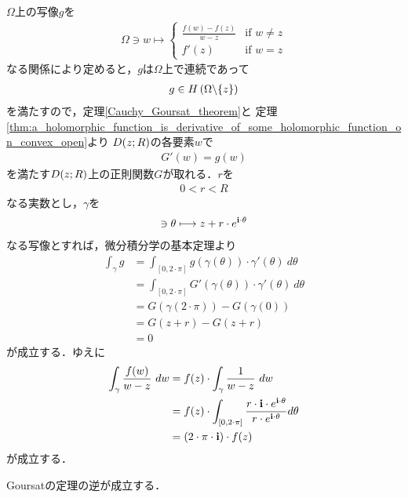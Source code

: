 	\begin{sketch}
		$\Omega$上の写像$g$を
		\begin{align}
			\Omega \ni w \longmapsto
			\begin{cases}
				\displaystyle{\frac{f(w) - f(z)}{w - z}} & \mbox{if } w \neq z \\
				f'(z) & \mbox{if } w = z
			\end{cases}
		\end{align}
		なる関係により定めると，$g$は$\Omega$上で連続であって
		\begin{align}
			g \in H\left(\Omega \backslash \{z\}\right)
		\end{align}
		を満たすので，定理\ref{Cauchy_Goursat_theorem}と
		定理\ref{thm:a_holomorphic_function_is_derivative_of_some_holomorphic_function_on_convex_open}より
		$D(z;R)$の各要素$w$で
		\begin{align}
			G'(w) = g(w)
		\end{align}
		を満たす$D(z;R)$上の正則関数$G$が取れる．$r$を
		\begin{align}
			0 < r < R
		\end{align}
		なる実数とし，$\gamma$を
		\begin{align}
			[0,2 \cdot \pi] \ni \theta \longmapsto z + r \cdot e^{\isym \cdot \theta}
		\end{align}
		なる写像とすれば，微分積分学の基本定理より
		\begin{align}
			\int_{\gamma} g
			&= \int_{[0,2 \cdot \pi]} g(\gamma(\theta)) \cdot \gamma'(\theta)\ d\theta \\
			&= \int_{[0,2 \cdot \pi]} G'(\gamma(\theta)) \cdot \gamma'(\theta)\ d\theta \\
			&= G(\gamma(2 \cdot \pi)) - G(\gamma(0)) \\
			&= G(z + r) - G(z + r) \\
			&= 0
		\end{align}
		が成立する．ゆえに
		\begin{align}
			\int_{\gamma} \frac{f(w)}{w - z}\ dw 
			&= f(z) \cdot \int_{\gamma} \frac{1}{w - z}\ dw \\
			&= f(z) \cdot \int_{[0,2\cdot\pi]} \frac{r \cdot \mathbf{i} \cdot e^{\mathbf{i} \cdot \theta}}{r \cdot e^{\mathbf{i} \cdot \theta}} d\theta \\
			&= (2 \cdot \pi \cdot \mathbf{i}) \cdot f(z)
		\end{align}
		が成立する．
		\QED
	\end{sketch}
	
	Goursatの定理の逆が成立する．
	\begin{screen}
		\begin{thm}[Moreraの定理]
			
		\end{thm}
	\end{screen}
	
